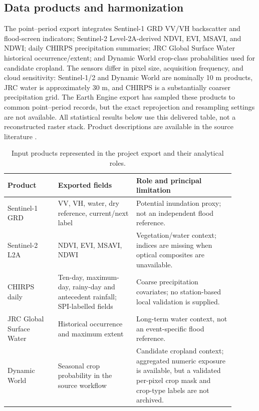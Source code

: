 \documentclass[pdflatex,sn-mathphys,Numbered]{sn-jnl}
\begin{document}
\subsection{Data products and harmonization}
The point--period export integrates Sentinel-1 GRD VV/VH backscatter and flood-screen indicators; Sentinel-2 Level-2A-derived NDVI, EVI, MSAVI, and NDWI; daily CHIRPS precipitation summaries; JRC Global Surface Water historical occurrence/extent; and Dynamic World crop-class probabilities used for candidate cropland. The sensors differ in pixel size, acquisition frequency, and cloud sensitivity: Sentinel-1/2 and Dynamic World are nominally 10 m products, JRC water is approximately 30 m, and CHIRPS is a substantially coarser precipitation grid. The Earth Engine export has sampled these products to common point--period records, but the exact reprojection and resampling settings are not available. All statistical results below use this delivered table, not a reconstructed raster stack. Product descriptions are available in the source literature \cite{funk2015,pekel2016,brown2022,torres2012,drusch2012,gorelick2017}.

\begin{table}[t]
\centering
\caption{Input products represented in the project export and their analytical roles.}
\label{tab:datasets}
\begin{tabular}{p{0.20\linewidth}p{0.31\linewidth}p{0.39\linewidth}}
\toprule
Product & Exported fields & Role and principal limitation \\
\midrule
Sentinel-1 GRD & VV, VH, water, dry reference, current/next label & Potential inundation proxy; not an independent flood reference. \\
Sentinel-2 L2A & NDVI, EVI, MSAVI, NDWI & Vegetation/water context; indices are missing when optical composites are unavailable. \\
CHIRPS daily & Ten-day, maximum-day, rainy-day and antecedent rainfall; SPI-labelled fields & Coarse precipitation covariates; no station-based local validation is supplied. \\
JRC Global Surface Water & Historical occurrence and maximum extent & Long-term water context, not an event-specific flood reference. \\
Dynamic World & Seasonal crop probability in the source workflow & Candidate cropland context; aggregated numeric exposure is available, but a validated per-pixel crop mask and crop-type labels are not archived. \\
\bottomrule
\end{tabular}
\end{table}
\end{document}
